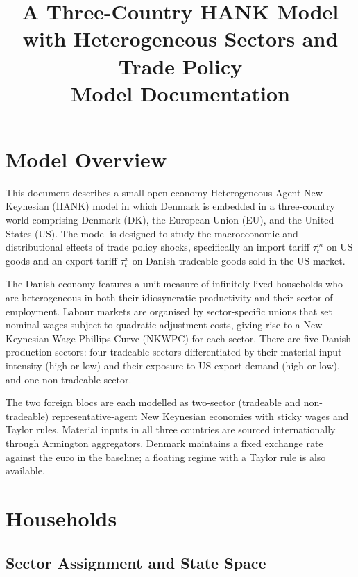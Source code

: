 \documentclass[12pt,a4paper]{article}
\title{\textbf{A Three-Country HANK Model with Heterogeneous Sectors and Trade Policy}\\[0.4em]
\large Model Documentation}
\author{}
\date{}
\begin{document}
\maketitle
\tableofcontents
\newpage

\section{Model Overview}

This document describes a small open economy Heterogeneous Agent New Keynesian (HANK) model in which Denmark is embedded in a three-country world comprising Denmark (DK), the European Union (EU), and the United States (US). The model is designed to study the macroeconomic and distributional effects of trade policy shocks, specifically an import tariff $\tau^m_t$ on US goods and an export tariff $\tau^x_t$ on Danish tradeable goods sold in the US market.

The Danish economy features a unit measure of infinitely-lived households who are heterogeneous in both their idiosyncratic productivity and their sector of employment. Labour markets are organised by sector-specific unions that set nominal wages subject to quadratic adjustment costs, giving rise to a New Keynesian Wage Phillips Curve (NKWPC) for each sector. There are five Danish production sectors: four tradeable sectors differentiated by their material-input intensity (high or low) and their exposure to US export demand (high or low), and one non-tradeable sector.

The two foreign blocs are each modelled as two-sector (tradeable and non-tradeable) representative-agent New Keynesian economies with sticky wages and Taylor rules. Material inputs in all three countries are sourced internationally through Armington aggregators. Denmark maintains a fixed exchange rate against the euro in the baseline; a floating regime with a Taylor rule is also available.

\section{Households}
\label{sec:hh}

\subsection{Sector Assignment and State Space}
\end{document}

